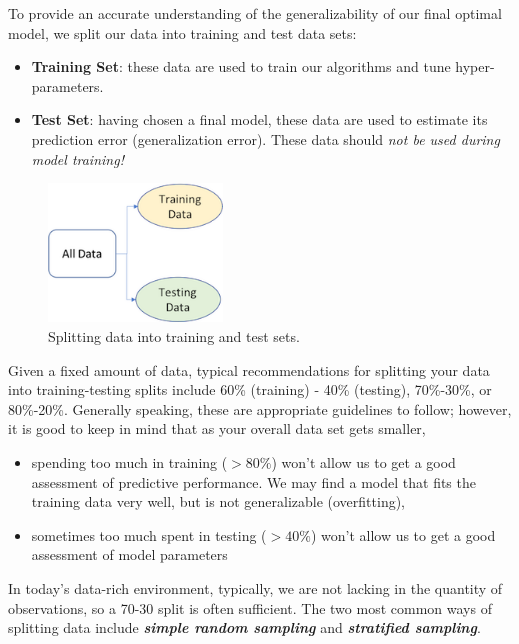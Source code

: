 \documentclass[]{book}
\providecommand{\tightlist}{%
  \setlength{\itemsep}{0pt}\setlength{\parskip}{0pt}}
\theoremstyle{definition}
\theoremstyle{definition}
\theoremstyle{definition}
\theoremstyle{remark}
\begin{document}
To provide an accurate understanding of the generalizability of our
final optimal model, we split our data into training and test data sets:

\begin{itemize}
\tightlist
\item
  \textbf{Training Set}: these data are used to train our algorithms and
  tune hyper-parameters.
\item
  \textbf{Test Set}: having chosen a final model, these data are used to
  estimate its prediction error (generalization error). These data
  should \emph{not be used during model training!}
\end{itemize}

\begin{figure}

{\centering \includegraphics[width=175]{illustrations/data_split} 

}

\caption{Splitting data into training and test sets.}\label{fig:unnamed-chunk-59}
\end{figure}

Given a fixed amount of data, typical recommendations for splitting your
data into training-testing splits include 60\% (training) - 40\%
(testing), 70\%-30\%, or 80\%-20\%. Generally speaking, these are
appropriate guidelines to follow; however, it is good to keep in mind
that as your overall data set gets smaller,

\begin{itemize}
\tightlist
\item
  spending too much in training (\(>80\%\)) won't allow us to get a good
  assessment of predictive performance. We may find a model that fits
  the training data very well, but is not generalizable (overfitting),
\item
  sometimes too much spent in testing (\(>40\%\)) won't allow us to get
  a good assessment of model parameters
\end{itemize}

In today's data-rich environment, typically, we are not lacking in the
quantity of observations, so a 70-30 split is often sufficient. The two
most common ways of splitting data include \textbf{\emph{simple random
sampling}} and \textbf{\emph{stratified sampling}}.
\end{document}
